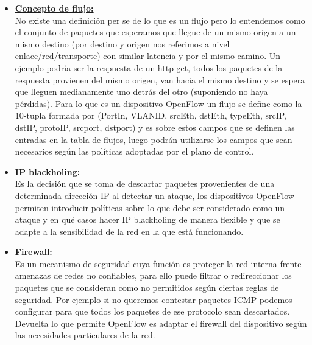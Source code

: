 \begin{itemize}
	\item \underline{\textbf{Concepto de flujo:}}\\
		No existe una definición per se de lo que es un flujo pero lo entendemos como el conjunto de paquetes que esperamos que llegue 			de un mismo origen a un mismo destino (por destino y origen nos referimos a nivel enlace/red/transporte) con similar latencia y 		por el mismo camino. Un ejemplo podría ser la respuesta de un http get, todos los paquetes de la respuesta provienen del mismo 			origen, van hacia el mismo destino y se espera que lleguen medianamente uno detrás del otro (suponiendo no haya pérdidas). Para 		lo que es un dispositivo OpenFlow un flujo se define como la 10-tupla formada por (PortIn, VLANID, srcEth, dstEth, typeEth, 			srcIP, dstIP, protoIP, srcport, dstport) y es sobre estos campos que se definen las entradas en la tabla de flujos, luego 			podrán utilizarse los campos que sean necesarios según las políticas adoptadas por el plano de control.

	\item \underline{\textbf{IP blackholing:}}\\
		Es la decisión que se toma de descartar paquetes provenientes de una determinada dirección IP al detectar un ataque, los 			dispositivos OpenFlow permiten introducir políticas sobre lo que debe ser considerado como un ataque y en qué casos hacer IP 			blackholing de manera flexible y que se adapte a la sensibilidad de la red en la que está funcionando.

	\item \underline{\textbf{Firewall:}}\\
		Es un mecanismo de seguridad cuya función es proteger la red interna frente amenazas de redes no confiables, para ello puede 			filtrar o redireccionar los paquetes que se consideran como no permitidos según ciertas reglas de seguridad. Por ejemplo si no 			queremos contestar paquetes ICMP podemos configurar para que todos los paquetes de ese protocolo sean descartados. Devuelta lo 			que permite OpenFlow es adaptar el firewall del dispositivo según las necesidades particulares de la red.
\end{itemize}

